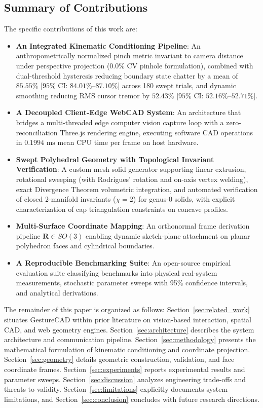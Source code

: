\subsection{Summary of Contributions}
The specific contributions of this work are:
\begin{itemize}
    \item \textbf{An Integrated Kinematic Conditioning Pipeline}: An anthropometrically normalized pinch metric invariant to camera distance under perspective projection ($0.0\%$ CV pinhole formulation), combined with dual-threshold hysteresis reducing boundary state chatter by a mean of $85.55\%$ [$95\%$ CI: $84.01\%$–$87.10\%$] across 180 swept trials, and dynamic smoothing reducing RMS cursor tremor by $52.43\%$ [$95\%$ CI: $52.16\%$–$52.71\%$].
    \item \textbf{A Decoupled Client-Edge WebCAD System}: An architecture that bridges a multi-threaded edge computer vision capture loop with a zero-reconciliation Three.js rendering engine, executing software CAD operations in $0.1994\text{ ms}$ mean CPU time per frame on host hardware.
    \item \textbf{Swept Polyhedral Geometry with Topological Invariant Verification}: A custom mesh solid generator supporting linear extrusion, rotational sweeping (with Rodrigues' rotation and on-axis vertex welding), exact Divergence Theorem volumetric integration, and automated verification of closed 2-manifold invariants ($\chi = 2$) for genus-0 solids, with explicit characterization of cap triangulation constraints on concave profiles.
    \item \textbf{Multi-Surface Coordinate Mapping}: An orthonormal frame derivation pipeline $\mathbf{R} \in SO(3)$ enabling dynamic sketch-plane attachment on planar polyhedron faces and cylindrical boundaries.
    \item \textbf{A Reproducible Benchmarking Suite}: An open-source empirical evaluation suite classifying benchmarks into physical real-system measurements, stochastic parameter sweeps with 95\% confidence intervals, and analytical derivations.
\end{itemize}

The remainder of this paper is organized as follows: Section~\ref{sec:related_work} situates GestureCAD within prior literature on vision-based interaction, spatial CAD, and web geometry engines. Section~\ref{sec:architecture} describes the system architecture and communication pipeline. Section~\ref{sec:methodology} presents the mathematical formulation of kinematic conditioning and coordinate projection. Section~\ref{sec:geometry} details geometric construction, validation, and face coordinate frames. Section~\ref{sec:experiments} reports experimental results and parameter sweeps. Section~\ref{sec:discussion} analyzes engineering trade-offs and threats to validity. Section~\ref{sec:limitations} explicitly documents system limitations, and Section~\ref{sec:conclusion} concludes with future research directions.
